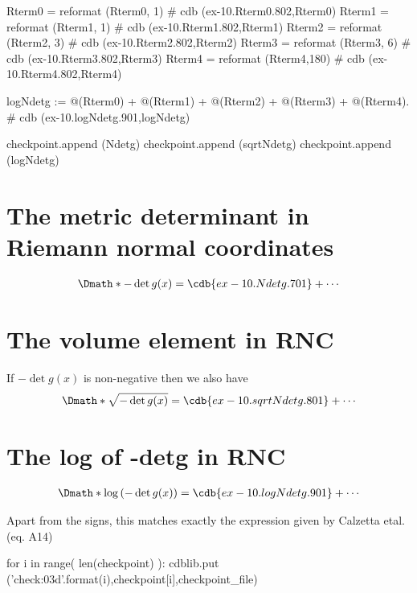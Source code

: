 \documentclass[12pt]{cdblatex}
\begin{document}
\begin{cadabra}
   Rterm0 = reformat (Rterm0,  1)    # cdb (ex-10.Rterm0.802,Rterm0)
   Rterm1 = reformat (Rterm1,  1)    # cdb (ex-10.Rterm1.802,Rterm1)
   Rterm2 = reformat (Rterm2,  3)    # cdb (ex-10.Rterm2.802,Rterm2)
   Rterm3 = reformat (Rterm3,  6)    # cdb (ex-10.Rterm3.802,Rterm3)
   Rterm4 = reformat (Rterm4,180)    # cdb (ex-10.Rterm4.802,Rterm4)

   logNdetg := @(Rterm0) + @(Rterm1) + @(Rterm2) + @(Rterm3) + @(Rterm4).  # cdb (ex-10.logNdetg.901,logNdetg)

   checkpoint.append (Ndetg)
   checkpoint.append (sqrtNdetg)
   checkpoint.append (logNdetg)

\end{cadabra}

\clearpage

\section*{The metric determinant in Riemann normal coordinates}

\def\Vert{\vrule height 10pt depth 3pt width 0.5pt}
\def\LVert{\Vert\hskip 1.75pt}
\def\RVert{\hskip 1pt\Vert}

\begin{dgroup*}
   \Dmath*{-\det g(x) = \cdb{ex-10.Ndetg.701}+\cdots}
\end{dgroup*}

\section*{The volume element in RNC}

If $-\det g(x)$ is non-negative then we also have
%
\begin{dgroup*}
   \Dmath*{\sqrt{-\det g(x)} = \cdb{ex-10.sqrtNdetg.801}+\cdots}
\end{dgroup*}

\section*{The log of -detg in RNC}
%
\begin{dgroup*}
   \Dmath*{\log\left(-\det g(x)\right) = \cdb{ex-10.logNdetg.901}+\cdots}
\end{dgroup*}

Apart from the signs, this matches exactly the expression given by Calzetta etal. (eq. A14)

\clearpage


\bgroup
{}
\begin{cadabra}
   for i in range( len(checkpoint) ):
      cdblib.put ('check{:03d}'.format(i),checkpoint[i],checkpoint_file)
\end{cadabra}
\egroup
\end{document}
